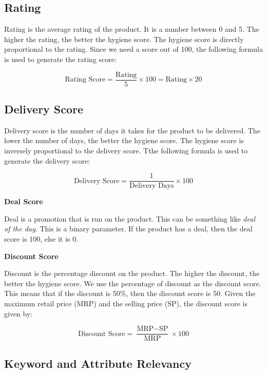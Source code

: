 \subsection{Rating}

Rating is the average rating of the product. It is a number between 0 and 5. The higher the rating, the better the hygiene score. The hygiene score is directly proportional to the rating. Since we need a score out of 100, the following formula is used to generate the rating score:

\begin{equation}
    \text{Rating Score} = \frac{\text{Rating}}{5} \times 100 = \text{Rating} \times 20
\end{equation}

\subsection{Delivery Score}

Delivery score is the number of days it takes for the product to be delivered. The lower the number of days, the better the hygiene score. The hygiene score is inversely proportional to the delivery score. Tthe following formula is used to generate the delivery score:

\begin{equation}
    \text{Delivery Score} = \frac{1}{\text{Delivery Days}} \times 100
\end{equation}

\textbf{Deal Score}

Deal is a promotion that is run on the product. This can be something like \textit{deal of the day}. This is a binary parameter. If the product has a deal, then the deal score is 100, else it is 0.

\textbf{Discount Score}

Discount is the percentage discount on the product. The higher the discount, the better the hygiene score. We use the percentage of discount as the discount score. This means that if the discount is 50\%, then the discount score is 50. Given the maximum retail price (MRP) and the selling price (SP), the discount score is given by:

\begin{equation}
    \text{Discount Score} = \frac{\text{MRP} - \text{SP}}{\text{MRP}} \times 100
\end{equation}

\subsection{Keyword and Attribute Relevancy}

